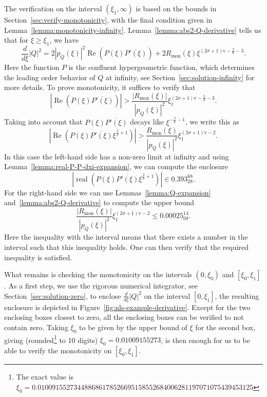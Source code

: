 \documentclass[11pt]{article}
\DeclareMathOperator{\real}{Re}
\newcommand{\conj}[1]{\overline{#1}}
\newcommand{\normv}{\mathrm{v}}
\begin{document}
The verification on the interval \((\xi_{1}, \infty)\) is based on the
bounds in Section~\ref{sec:verify-monotonicity}, with the final
condition given in Lemma~\ref{lemma:monotonicity-infinity}.
Lemma~\ref{lemma:abs2-Q-derivative} tells us that for
\(\xi \geq \xi_{1}\), we have
\begin{equation*}
  \frac{d}{d\xi}|Q|^{2}
  = 2|p_{Q}(\xi)|^{2}\real\left(P(\xi)\conj{P'(\xi)}\right)
  + 2R_{\mathrm{mon}}(\xi)\xi^{(2\sigma + 1)\normv - \frac{2}{\sigma} - 3}.
\end{equation*}
Here the function \(P\) is the confluent hypergeometric function,
which determines the leading order behavior of \(Q\) at infinity, see
Section~\ref{sec:solution-infinity} for more details. To prove
monotonicity, it suffices to verify that
\begin{equation*}
  \left|\real\left(P(\xi)\conj{P'(\xi)}\right)\right| > \frac{|R_{\mathrm{mon}}(\xi)|}{|p_{Q}(\xi)|^{2}}\xi_{1}^{(2\sigma + 1)\normv - \frac{2}{\sigma} - 3}.
\end{equation*}
Taking into account that \(P(\xi)\conj{P'(\xi)}\) decays like
\(\xi^{-\frac{2}{\sigma} - 1}\), we write this as
\begin{equation*}
  \left|\real\left(P(\xi)\conj{P'(\xi)}\xi^{\frac{2}{\sigma} + 1}\right)\right| > \frac{R_{\mathrm{mon}}(\xi)}{|p_{Q}(\xi)|^{2}}\xi_{1}^{(2\sigma + 1)\normv - 2}.
\end{equation*}
In this case the left-hand side has a non-zero limit at infinity and
using Lemma~\ref{lemma:real-P-P-dxi-expansion}, we can compute the
enclosure
\begin{equation*}
  \left|\operatorname{real}\left(P(\xi)\overline{P'(\xi)}\xi^{\frac{2}{\sigma} + 1}\right)\right|
  \in 0.393_{28}^{68}.
\end{equation*}
For the right-hand side we can use Lemmas~\ref{lemma:Q-expansion}
and~\ref{lemma:abs2-Q-derivative} to compute the upper bound
\begin{equation*}
  \frac{|R_{\mathrm{mon}}(\xi)|}{|p_{Q}(\xi)|^{2}}\xi_{1}^{(2\sigma + 1)\mathrm{v} - 2} \leq 0.00025_{08}^{14}.
\end{equation*}
Here the inequality with the interval means that there exists a number
in the interval such that this inequality holds. One can then verify
that the required inequality is satisfied.

What remains is checking the monotonicity on the intervals
\((0, \xi_{0})\) and \([\xi_{0}, \xi_{1}]\). As a first step, we use
the rigorous numerical integrator, see
Section~\ref{sec:solution-zero}, to enclose \(\frac{d}{d\xi}|Q|^{2}\)
on the interval \([0, \xi_{1}]\), the resulting enclosure is depicted
in Figure~\ref{fig:nls-example-derivative}. Except for the two
enclosing boxes closest to zero, all the enclosing boxes can be
verified to not contain zero. Taking \(\xi_{0}\) to be given by the
upper bound of \(\xi\) for the second box, giving
(rounded\footnote{The exact value is
  \(\xi_0 =
  0.010091552734488686178526695158552684006281197071075439453125\)} to
10 digits) \(\xi_{0} = 0.01009155273\), is then enough for us to be
able to verify the monotonicity on \([\xi_{0}, \xi_{1}]\).
\end{document}
